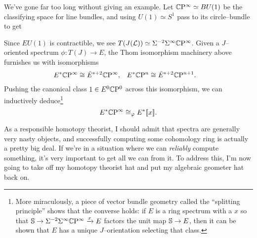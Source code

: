 We've gone far too long without giving an example.  Let $\CP^\infty \simeq BU(1)$ be the classifying space for line bundles, and using $U(1) \simeq S^1$ pass to its  circle--bundle to get
\begin{center}
\end{center}
Since $EU(1)$ is contractible, we see $T(J(\mathcal L)) \simeq \Susp^{-2} \Susp^\infty \CP^\infty$.  Given a $J$--oriented spectrum $\phi: T(J) \to E$, the Thom isomorphism machinery above furnishes us with isomorphisms
\begin{align*}
E^* \CP^\infty & \cong \tilde E^{*+2} \CP^\infty, &
E^* \CP^n & \cong \tilde E^{*+2} \CP^{n+1}.
\end{align*}
Pushing the canonical class $1 \in E^0 \CP^0$ across this isomorphism, we can inductively deduce\footnote{More miraculously, a piece of vector bundle geometry called the ``splitting principle'' shows that the converse holds: if $E$ is a ring spectrum with a $x$ so that $\S \to \Susp^{-2} \Susp^\infty \CP^\infty \xrightarrow{x} E$ factors the unit map $\S \to E$, then it can be shown that $E$ has a unique $J$--orientation selecting that class.} \[E^* \CP^\infty \cong_\phi E^*\ps{x}.\]

As a responsible homotopy theorist, I should admit that spectra are generally very nasty objects, and successfully computing some cohomology ring is actually a pretty big deal.  If we're in a situation where we can \emph{reliably} compute something, it's very important to get all we can from it.  To address this, I'm now going to take off my homotopy theorist hat and put my algebraic geometer hat back on.

